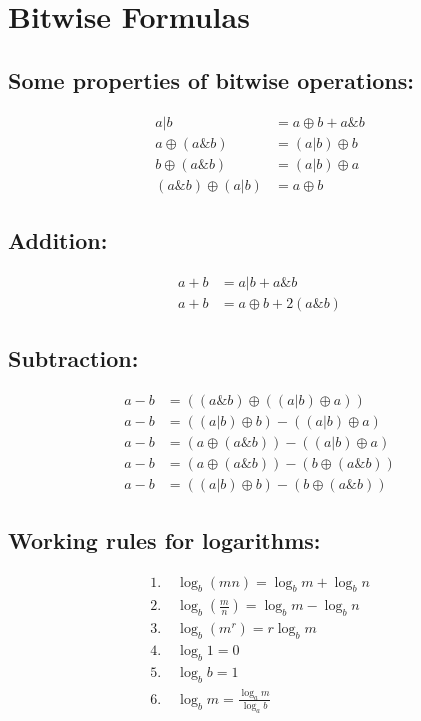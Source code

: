 \section{Bitwise Formulas}

{\small
\subsection*{Some properties of bitwise operations:}
\begin{align*}
  a | b &= a \oplus b + a \& b \\
  a \oplus (a \& b) &= (a | b) \oplus b \\
  b \oplus (a \& b) &= (a | b) \oplus a \\
  (a \& b) \oplus (a | b) &= a \oplus b
\end{align*}

\subsection*{Addition:}
\begin{align*}
  a + b &= a | b + a \& b \\
  a + b &= a \oplus b + 2(a \& b)
\end{align*}

\subsection*{Subtraction:}
\begin{align*}
  a - b &= ((a \& b) \oplus ((a | b) \oplus a)) \\[2mm]
  a - b &= ((a | b) \oplus b) - ((a | b) \oplus a) \\[2mm]
  a - b &= (a \oplus (a \& b)) - ((a | b) \oplus a) \\[2mm]
  a - b &= (a \oplus (a \& b)) - (b \oplus (a \& b)) \\[2mm]
  a - b &= ((a | b) \oplus b) - (b \oplus (a \& b))
\end{align*}

\subsection*{Working rules for logarithms:}
\begin{align*}
  1.\;& \log_b (mn) = \log_b m + \log_b n \\
  2.\;& \log_b \!\left(\frac{m}{n}\right) = \log_b m - \log_b n \\
  3.\;& \log_b (m^r) = r \log_b m \\
  4.\;& \log_b 1 = 0 \\
  5.\;& \log_b b = 1 \\
  6.\;& \log_b m = \frac{\log_a m}{\log_a b}
\end{align*}
}
